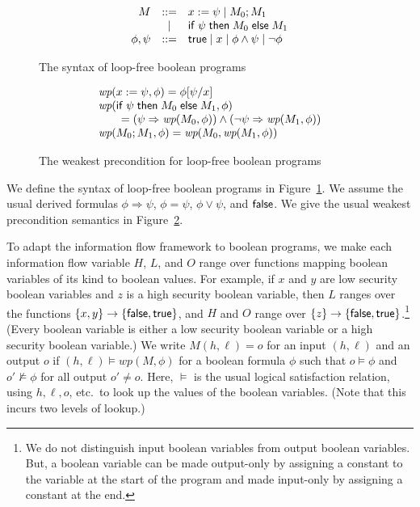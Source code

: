 \documentclass{llncs}
\newcommand{\aset}[1]{\{{#1}\}}
\newcommand{\wpre}[2]{\textit{wp}({#1}, {#2})}
\begin{document}
\begin{figure}[t]
\[
\begin{array}[t]{rcl}
  M&::=&x:=\psi\mid M_0 ; M_1 \\
  & \mid &{\sf if}\; \psi\;{\sf then}\; M_0 \;{\sf else}\; M_1\\
  \phi,\psi&::=&{\sf true}\mid x\mid \phi\wedge \psi\mid \neg \phi
\end{array}
\]
\caption{The syntax of loop-free boolean programs}
\label{fig:syntax}
\end{figure}

\begin{figure}[t]
\[
\begin{array}[t]{l}
\wpre{x:=\psi}{\phi}=\phi[\psi/x]\\
\wpre{{\sf if}\;\psi\;{\sf then}\;M_0\;{\sf else}\;M_1}{\phi}\\
\qquad=(\psi\Rightarrow \wpre{M_0}{\phi})\wedge(\neg \psi\Rightarrow \wpre{M_1}{\phi})\\
\wpre{M_0;M_1}{\phi}=\wpre{M_0}{\wpre{M_1}{\phi}}
\end{array}
\]
\caption{The weakest precondition for loop-free boolean programs}
\label{fig:wpsemantics}
\end{figure}

We define the syntax of loop-free boolean programs in
Figure~\ref{fig:syntax}.  We assume the usual derived formulas $\phi
\Rightarrow \psi$, $\phi = \psi$, $\phi \vee \psi$, and ${\sf false}$.
We give the usual weakest precondition semantics in
Figure~\ref{fig:wpsemantics}.

To adapt the information flow framework to boolean programs, we make
each information flow variable $H$, $L$, and $O$ range over functions
mapping boolean variables of its kind to boolean values.  For example,
if $x$ and $y$ are low security boolean variables and $z$ is a high
security boolean variable, then $L$ ranges over the functions
$\aset{x,y} \rightarrow \aset{{\sf false},{\sf true}}$, and $H$ and
$O$ range over $\aset{z} \rightarrow \aset{{\sf false},{\sf
    true}}$.\footnote{ We do not distinguish input boolean variables
  from output boolean variables.  But, a boolean variable can be made
  output-only by assigning a constant to the variable at the start of
  the program and made input-only by assigning a constant at the end.}
(Every boolean variable is either a low security boolean variable or a
high security boolean variable.)  We write $M(h,\ell) = o$ for an
input $(h,\ell)$ and an output $o$ if $(h,\ell) \models
\wpre{M}{\phi}$ for a boolean formula $\phi$ such that $o \models
\phi$ and $o' \not\models \phi$ for all output $o' \neq o$.  Here,
$\models$ is the usual logical satisfaction relation, using
$h,\ell,o$, etc.~to look up the values of the boolean variables.
(Note that this incurs two levels of lookup.)
\end{document}

